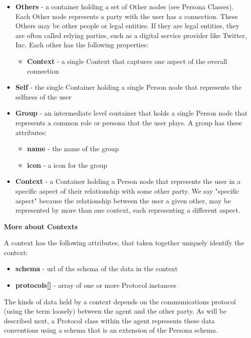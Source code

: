 \documentclass[11pt, oneside]{article}   	%
\begin{document}
\begin{itemize}
\item \textbf{Others} - a container holding a set of Other nodes (see Persona Classes). Each Other node represents a party with the user has a connection. These Others may be other people or legal entities. If they are legal entities, they are often called relying parties, such as a digital service provider like Twitter, Inc. Each other has the following properties:
	\begin{itemize}
	\item \textbf{Context} - a single Context that captures one aspect of the overall connection
	\end{itemize}
\item \textbf{Self} - the single Container holding a single Person node that represents the selfness of the user
\item \textbf{Group} - an intermediate level container that holds a single Person node that represents a common role or persona that the user plays. A group has these attributes:
	\begin{itemize}
	\item \textbf{name} - the name of the group 
	\item \textbf{icon} - a icon for the group
	\end{itemize}
\item \textbf{Context} - a Container holding a Person node that represents the user in a specific aspect of their relationship with some other party. We say "specific aspect" because the relationship between the user a given other, may be represented by more than one context, each representing a different aspect. 
\end{itemize}

\textbf{More about Contexts}

A context has the following attributes, that taken together uniquely identify the context:

\begin{itemize}
\item \textbf{schema} - url of the schema of the data in the context
\item \textbf{protocols[]} - array of one or more Protocol instances
\end{itemize}

The kinds of data held by a context depends on the communications protocol (using the term loosely) between the agent and the other party. As will be described next, a Protocol class within the agent represents these data conventions using a schema that is an extension of the Persona schema.
\end{document}
